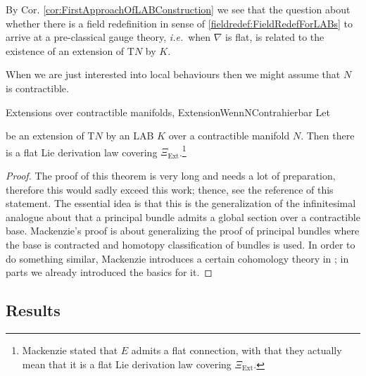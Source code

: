 By Cor. \ref{cor:FirstApproachOfLABConstruction} we see that the question about whether there is a field redefinition in sense of \ref{fieldredef:FieldRedefForLABs} to arrive at a pre-classical gauge theory, \textit{i.e.}~when $\nabla$ is flat, is related to the existence of an extension of $\mathrm{T}N$ by $K$.

When we are just interested into local behaviours then we might assume that $N$ is contractible.

\begin{theorems}{Extensions over contractible manifolds, \newline \cite[\S 8.2, Theorem 8.2.1, replace $A$ with $E$, $L$ with $K$ and $TM$ with $\mathrm{T}N$; page 314ff.]{mackenzieGeneralTheory}}{ExtensionWennNContrahierbar}
Let
\begin{center}
\end{center}
be an extension of $\mathrm{T}N$ by an LAB $K$ over a contractible manifold $N$. Then there is a flat Lie derivation law covering $\Xi_{\mathrm{Ext}}$.\footnote{Mackenzie stated that $E$ admits a flat connection, with that they actually mean that it is a flat Lie derivation law covering $\Xi_{\mathrm{Ext}}$.}
\end{theorems}

\begin{proof}
\leavevmode\newline
The proof of this theorem is very long and needs a lot of preparation, therefore this would sadly exceed this work; thence, see the reference of this statement. The essential idea is that this is the generalization of the infinitesimal analogue about that a principal bundle admits a global section over a contractible base. Mackenzie's proof is about generalizing the proof of principal bundles where the base is contracted and homotopy classification of bundles is used. In order to do something similar, Mackenzie introduces a certain cohomology theory in \cite[\S 7; page 257ff.]{mackenzieGeneralTheory}; in parts we already introduced the basics for it.
\end{proof}

\subsection{Results}\label{LABResultsWooooo}

